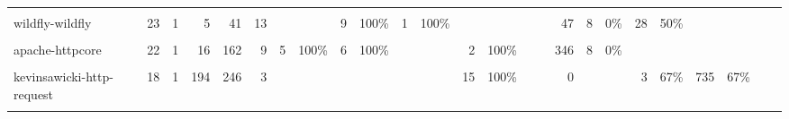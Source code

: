\begin{table*}
{\begin{tabular}{lrrrr|rrrrrrrrrrr|rrrrrrrrr}
\cellcolor{gray!6}{tootallnate-java-websocket}&\cellcolor{gray!6}{23}&\cellcolor{gray!6}{1}&\cellcolor{gray!6}{48}&\cellcolor{gray!6}{215}&\cellcolor{gray!6}{1}&\cellcolor{gray!6}{ }&\cellcolor{gray!6}{ }&\cellcolor{gray!6}{2}&\cellcolor{gray!6}{50\%}&\cellcolor{gray!6}{29}&\cellcolor{gray!6}{100\%}&\cellcolor{gray!6}{13}&\cellcolor{gray!6}{100\%}&\cellcolor{gray!6}{ }&\cellcolor{gray!6}{ }&\cellcolor{gray!6}{1139}&\cellcolor{gray!6}{435}&\cellcolor{gray!6}{26\%}&\cellcolor{gray!6}{265}&\cellcolor{gray!6}{54\%}&\cellcolor{gray!6}{ }&\cellcolor{gray!6}{ }&\cellcolor{gray!6}{ }&\cellcolor{gray!6}{ }\\
wildfly-wildfly&23&1&5&41&13& & &9&100\%&1&100\%& & & & &47&8&0\%&28&50\%& & & & \\
\cellcolor{gray!6}{qos-ch-logback}&\cellcolor{gray!6}{22}&\cellcolor{gray!6}{1}&\cellcolor{gray!6}{185}&\cellcolor{gray!6}{3824}&\cellcolor{gray!6}{6}&\cellcolor{gray!6}{5}&\cellcolor{gray!6}{60\%}&\cellcolor{gray!6}{2}&\cellcolor{gray!6}{100\%}&\cellcolor{gray!6}{8}&\cellcolor{gray!6}{100\%}&\cellcolor{gray!6}{1}&\cellcolor{gray!6}{100\%}&\cellcolor{gray!6}{1}&\cellcolor{gray!6}{100\%}&\cellcolor{gray!6}{3952}&\cellcolor{gray!6}{308}&\cellcolor{gray!6}{0\%}&\cellcolor{gray!6}{6}&\cellcolor{gray!6}{0\%}&\cellcolor{gray!6}{ }&\cellcolor{gray!6}{ }&\cellcolor{gray!6}{ }&\cellcolor{gray!6}{ }\\
apache-httpcore&22&1&16&162&9&5&100\%&6&100\%& & &2&100\%& & &346&8&0\%& & & & & & \\
\cellcolor{gray!6}{apache-incubator-dubbo}&\cellcolor{gray!6}{19}&\cellcolor{gray!6}{1}&\cellcolor{gray!6}{462}&\cellcolor{gray!6}{8849}&\cellcolor{gray!6}{2}&\cellcolor{gray!6}{4}&\cellcolor{gray!6}{100\%}&\cellcolor{gray!6}{9}&\cellcolor{gray!6}{100\%}&\cellcolor{gray!6}{3}&\cellcolor{gray!6}{100\%}&\cellcolor{gray!6}{1}&\cellcolor{gray!6}{100\%}&\cellcolor{gray!6}{1}&\cellcolor{gray!6}{100\%}&\cellcolor{gray!6}{8563}&\cellcolor{gray!6}{654}&\cellcolor{gray!6}{0\%}&\cellcolor{gray!6}{9}&\cellcolor{gray!6}{22\%}&\cellcolor{gray!6}{ }&\cellcolor{gray!6}{ }&\cellcolor{gray!6}{ }&\cellcolor{gray!6}{ }\\
kevinsawicki-http-request&18&1&194&246&3& & & & & & &15&100\%& & &0& & &3&67\%&735&67\%& & \\
\cellcolor{gray!6}{wro4j-wro4j}&\cellcolor{gray!6}{16}&\cellcolor{gray!6}{1}&\cellcolor{gray!6}{474}&\cellcolor{gray!6}{1803}&\cellcolor{gray!6}{1}&\cellcolor{gray!6}{ }&\cellcolor{gray!6}{ }&\cellcolor{gray!6}{2}&\cellcolor{gray!6}{100\%}&\cellcolor{gray!6}{7}&\cellcolor{gray!6}{71\%}&\cellcolor{gray!6}{1}&\cellcolor{gray!6}{100\%}&\cellcolor{gray!6}{12}&\cellcolor{gray!6}{100\%}&\cellcolor{gray!6}{382}&\cellcolor{gray!6}{227}&\cellcolor{gray!6}{0\%}&\cellcolor{gray!6}{6285}&\cellcolor{gray!6}{44\%}&\cellcolor{gray!6}{44}&\cellcolor{gray!6}{27\%}&\cellcolor{gray!6}{ }&\cellcolor{gray!6}{ }\\

\end{tabular}}
\end{table*}

